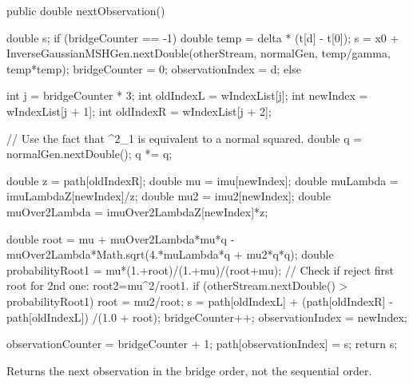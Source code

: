 \begin{code}

   public double nextObservation() \begin{hide} {
        double s;
        if (bridgeCounter == -1) 
        {
            double temp = delta * (t[d] - t[0]);
            s = x0 + InverseGaussianMSHGen.nextDouble(otherStream,
                                                normalGen, temp/gamma, temp*temp);
            bridgeCounter    = 0;
            observationIndex = d;
        }
        else
        {
            int j = bridgeCounter * 3;
            int oldIndexL = wIndexList[j];
            int newIndex  = wIndexList[j + 1];
            int oldIndexR = wIndexList[j + 2];

            // Use the fact that \chi^2_1 is equivalent to a normal squared.
            double q = normalGen.nextDouble();
            q *= q;

            double z        = path[oldIndexR];
            double mu       = imu[newIndex];
            double muLambda = imuLambdaZ[newIndex]/z;
            double mu2      = imu2[newIndex];
            double muOver2Lambda = imuOver2LambdaZ[newIndex]*z;

            double root = mu + muOver2Lambda*mu*q -
            muOver2Lambda*Math.sqrt(4.*muLambda*q + mu2*q*q);
            double probabilityRoot1 = mu*(1.+root)/(1.+mu)/(root+mu);
            // Check if reject first root for 2nd one: root2=mu^2/root1.
            if (otherStream.nextDouble() > probabilityRoot1)
                root = mu2/root;
            s = path[oldIndexL] + (path[oldIndexR] - path[oldIndexL]) /(1.0 + root);
            bridgeCounter++;
            observationIndex = newIndex;
        }
        observationCounter = bridgeCounter + 1;
        path[observationIndex] = s;
        return s;
    }\end{hide}
\end{code}
\begin{tabb}
Returns the next observation in the bridge order,
not the sequential order.
\end{tabb}

